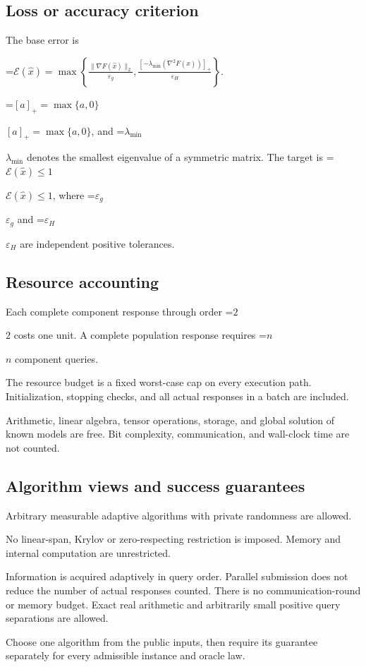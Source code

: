 \documentclass[10pt,a4paper]{article}
\newcommand{\AtlasMath}[1]{\par\begingroup\centering\setbox0=\hbox{$\displaystyle #1$}\ifdim\wd0>1.4\linewidth\typeout{ATLAS WIDE FORMULA: \the\wd0}\fi\ifdim\wd0>\linewidth\resizebox{\linewidth}{!}{\box0}\else\box0\fi\par\endgroup}
\newcommand{\AtlasInlineMath}[1]{\begingroup\setbox0=\hbox{$#1$}\ifdim\wd0>.4\linewidth\endgroup\AtlasMath{#1}\else\endgroup$#1$\fi}
\begin{document}
\subsection{Loss or accuracy criterion}
The base error is


\AtlasMath{\mathcal{E}(\widehat{x})=\max\left\{\frac{\|\nabla F(\widehat{x})\|_2}{\varepsilon_g},\frac{[-\lambda_{\min}(\nabla^2F(\widehat{x}))]_+}{\varepsilon_H}\right\}.}


\AtlasInlineMath{[a]_+=\max\{a,0\}}, and \AtlasInlineMath{\lambda_{\min}} denotes the smallest eigenvalue of a symmetric matrix. The target is \AtlasInlineMath{\mathcal{E}(\widehat{x})\le1}, where \AtlasInlineMath{\varepsilon_g} and \AtlasInlineMath{\varepsilon_H} are independent positive tolerances.

\subsection{Resource accounting}
Each complete component response through order \AtlasInlineMath{2} costs one unit. A complete population response requires \AtlasInlineMath{n} component queries.

The resource budget is a fixed worst-case cap on every execution path. Initialization, stopping checks, and all actual responses in a batch are included.

Arithmetic, linear algebra, tensor operations, storage, and global solution of known models are free. Bit complexity, communication, and wall-clock time are not counted.

\subsection{Algorithm views and success guarantees}
Arbitrary measurable adaptive algorithms with private randomness are allowed.

No linear-span, Krylov or zero-respecting restriction is imposed. Memory and internal computation are unrestricted.

Information is acquired adaptively in query order. Parallel submission does not reduce the number of actual responses counted. There is no communication-round or memory budget. Exact real arithmetic and arbitrarily small positive query separations are allowed.

Choose one algorithm from the public inputs, then require its guarantee separately for every admissible instance and oracle law.
\end{document}
